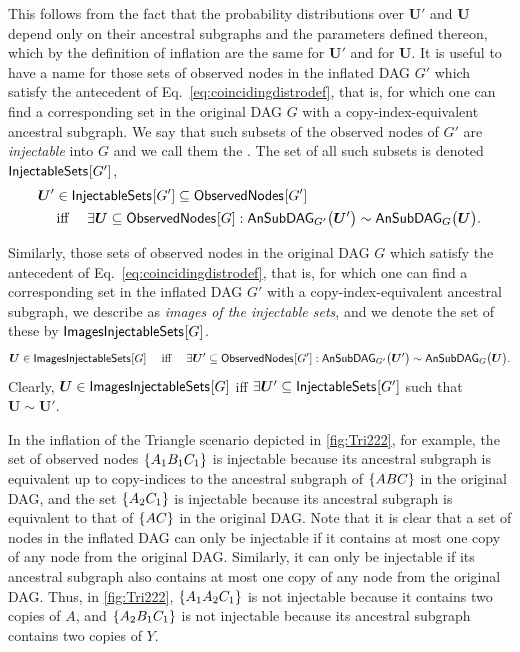 This follows from the fact that the probability distributions over $\bm{U}'$ and $\bm{U}$ depend only on their ancestral subgraphs and the parameters defined thereon, which by the definition of inflation are the same for $\bm{U}'$ and for $\bm{U}$.
It is useful to have a name for those sets of observed nodes in the inflated DAG $G'$ which satisfy the antecedent of Eq.~\eqref{eq:coincidingdistrodef}, that is, for which one can find a corresponding set in the original DAG $G$ with a copy-index-equivalent ancestral subgraph.  We say that such subsets of the observed nodes of $G'$ are {\em injectable} into $G$ and we call them the .  The set of all such subsets is denoted $\SmallNamedFunction{InjectableSets}{G'}$,
\begin{align}\begin{split}\label{eq:definjectable}
&\bm{U}'\in\SmallNamedFunction{InjectableSets}{G'} \subseteq \SmallNamedFunction{ObservedNodes}{G'} \\
&\quad\text{ iff }\quad \exists \bm{U}\subseteq \SmallNamedFunction{ObservedNodes}{G}: \ansubgraph[G']{\bm{U}'}\sim\ansubgraph[G]{\bm{U}}.
\end{split}\end{align}

Similarly,  those sets of observed nodes in the original DAG $G$ which satisfy the antecedent of Eq.~\eqref{eq:coincidingdistrodef}, that is, for which one can find a corresponding set in the inflated DAG $G'$ with a copy-index-equivalent ancestral subgraph, we describe as {\em images of the injectable sets}, and we denote the set of these by $\SmallNamedFunction{ImagesInjectableSets}{G}$.
\begin{align}\begin{split}\label{eq:defimageinjectable}
\bm{U}\in\SmallNamedFunction{ImagesInjectableSets}{G}\quad\text{ iff }\quad \exists \bm{U}' \subseteq \SmallNamedFunction{ObservedNodes}{G'}: \ansubgraph[G']{\bm{U}'}\sim\ansubgraph[G]{\bm{U}}.
\end{split}\end{align}
Clearly, $\bm{U}\in\SmallNamedFunction{ImagesInjectableSets}{G}$ iff $\exists \bm{U}' \subseteq \SmallNamedFunction{InjectableSets}{G'}$ such that $\bm{U}\sim \bm{U}'$.


In the inflation of the Triangle scenario depicted in \cref{fig:Tri222}, for example, the set of observed nodes $\brackets{A_1 B_1 C_1}$ is injectable because its ancestral subgraph is equivalent up to copy-indices to the ancestral subgraph of $\brackets{A B C}$ in the original DAG, and the set $\brackets{A_2 C_1}$ is injectable because its ancestral subgraph is equivalent to that of $\brackets{ A C}$ in the original DAG.  Note that it is clear that a set of nodes in the inflated DAG can only be injectable if it contains at most one copy of any node from the original DAG.  Similarly, it can only be injectable if its ancestral subgraph also contains at most one copy of any node from the original DAG.  
Thus, in \cref{fig:Tri222}, $\brackets{A_1 A_2 C_1}$ is not injectable because it contains two copies of $A$, and $\brackets{A_2 B_1 C_1}$ is not injectable because its ancestral subgraph contains two copies of $Y$. 

